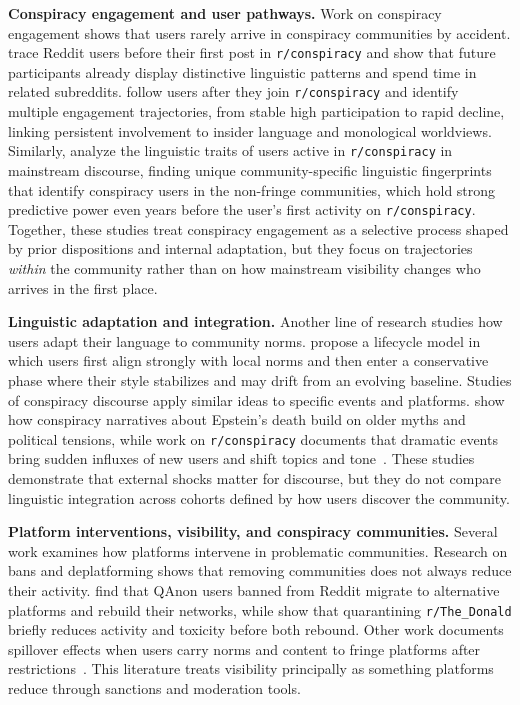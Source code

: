 \documentclass[letterpaper]{article} %
\newcommand{\spara}[1]{\smallskip\noindent\textbf{#1}}
\begin{document}
\spara{Conspiracy engagement and user pathways.}
Work on conspiracy engagement shows that users rarely arrive in conspiracy communities by accident.
\citet{klein_pathways_2019} trace Reddit users before their first post in \texttt{r/conspiracy} and show that future participants already display distinctive linguistic patterns and spend time in related subreddits. 
\citet{phadke_pathways_2022} follow users after they join \texttt{r/conspiracy} and identify multiple engagement trajectories, from stable high participation to rapid decline, linking persistent involvement to insider language and monological worldviews. 
Similarly, \citet{corso2025early} analyze the linguistic traits of users active in \texttt{r/conspiracy} in mainstream discourse, finding unique community-specific linguistic fingerprints that identify conspiracy users in the non-fringe communities, which hold strong predictive power even years before the user's first activity on \texttt{r/conspiracy}.
Together, these studies treat conspiracy engagement as a selective process shaped by prior dispositions and internal adaptation, but they focus on trajectories \emph{within} the community rather than on how mainstream visibility changes who arrives in the first place.

\spara{Linguistic adaptation and integration.}
Another line of research studies how users adapt their language to community norms. 
\citet{danescu-niculescu-mizil_no_2013} propose a lifecycle model in which users first align strongly with local norms and then enter a conservative phase where their style stabilizes and may drift from an evolving baseline. 
Studies of conspiracy discourse apply similar ideas to specific events and platforms. 
\citet{schatto-eckrodt_seed_2024} show how conspiracy narratives about Epstein's death build on older myths and political tensions, while work on \texttt{r/conspiracy} documents that dramatic events bring sudden influxes of new users and shift topics and tone~\citep{samory_conspiracies_2018, de_wildt_participatory_2024}. 
These studies demonstrate that external shocks matter for discourse, but they do not compare linguistic integration across cohorts defined by how users discover the community.

\spara{Platform interventions, visibility, and conspiracy communities.}
Several work examines how platforms intervene in problematic communities. 
Research on bans and deplatforming shows that removing communities does not always reduce their activity. 
\citet{monti_online_2023} find that QAnon users banned from Reddit migrate to alternative platforms and rebuild their networks, while \citet{trujillo_make_2022} show that quarantining \texttt{r/The\_Donald} briefly reduces activity and toxicity before both rebound. 
Other work documents spillover effects when users carry norms and content to fringe platforms after restrictions~\citep{horta_ribeiro_deplatforming_2023, russo_spillover_2023}. 
This literature treats visibility principally as something platforms reduce through sanctions and moderation tools.
\end{document}
